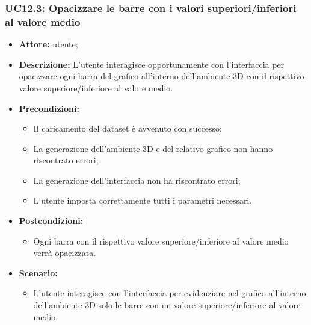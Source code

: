 \subsubsection{UC12.3: Opacizzare le barre con i valori superiori/inferiori al valore medio}
\begin{itemize}    
    \item \textbf{Attore:} utente;
    \item \textbf{Descrizione:} L'utente interagisce opportunamente con l'interfaccia per opacizzare ogni barra del grafico all'interno dell'ambiente 3D con il rispettivo valore superiore/inferiore al valore medio.
    \item \textbf{Precondizioni:}    
        \begin{itemize}
            \item Il caricamento del dataset è avvenuto con successo;
            \item La generazione dell'ambiente 3D e del relativo grafico non hanno riscontrato errori;
            \item La generazione dell'interfaccia non ha riscontrato errori;
            \item L'utente imposta correttamente tutti i parametri necessari.
        \end{itemize}    
    \item \textbf{Postcondizioni:}
        \begin{itemize}
            \item Ogni barra con il rispettivo valore superiore/inferiore al valore medio verrà opacizzata.
        \end{itemize}    
    \item \textbf{Scenario:} 
        \begin{itemize}
            \item L'utente interagisce con l'interfaccia per evidenziare nel grafico all'interno dell'ambiente 3D solo le barre con un valore superiore/inferiore al valore medio.
        \end{itemize}
\end{itemize}

